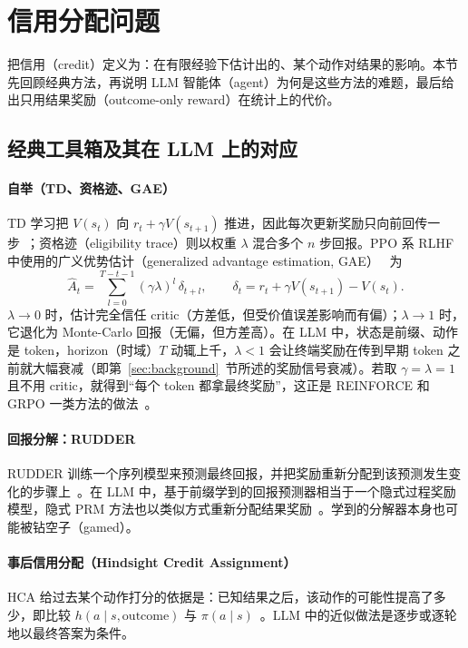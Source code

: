 \section{信用分配问题}\label{sec:problem}

\citet{pignatelli2024survey} 把信用（credit）定义为：在有限经验下估计出的、某个动作对结果的影响。本节先回顾经典方法，再说明 LLM 智能体（agent）为何是这些方法的难题，最后给出只用结果奖励（outcome-only reward）在统计上的代价。

\subsection{经典工具箱及其在 LLM 上的对应}

\paragraph{自举（TD、资格迹、GAE）}
TD 学习把 $V(s_t)$ 向 $r_t+\gamma V(s_{t+1})$ 推进，因此每次更新奖励只向前回传一步~\citep{sutton1988learning,sutton2018reinforcement}；资格迹（eligibility trace）则以权重 $\lambda$ 混合多个 $n$ 步回报。PPO 系 RLHF 中使用的广义优势估计（generalized advantage estimation, GAE）~\citep{schulman2015high} 为
\begin{equation}
  \hat A_t=\sum_{l=0}^{T-t-1}(\gamma\lambda)^l\,\delta_{t+l},\qquad
  \delta_t=r_t+\gamma V(s_{t+1})-V(s_t).
  \label{eq:gae}
\end{equation}
$\lambda\to 0$ 时，估计完全信任 critic（方差低，但受价值误差影响而有偏）；$\lambda\to1$ 时，它退化为 Monte-Carlo 回报（无偏，但方差高）。在 LLM 中，状态是前缀、动作是 token，horizon（时域）$T$ 动辄上千，$\lambda<1$ 会让终端奖励在传到早期 token 之前就大幅衰减（即第~\ref{sec:background}~节所述的奖励信号衰减）。若取 $\gamma=\lambda=1$ 且不用 critic，就得到“每个 token 都拿最终奖励”，这正是 REINFORCE 和 GRPO 一类方法的做法~\citep{hu2025reinforce,shao2024deepseekmath}。

\paragraph{回报分解：RUDDER}
RUDDER 训练一个序列模型来预测最终回报，并把奖励重新分配到该预测发生变化的步骤上~\citep{arjonamedina2019rudder}。在 LLM 中，基于前缀学到的回报预测器相当于一个隐式过程奖励模型，隐式 PRM 方法也以类似方式重新分配结果奖励~\citep{cui2025process}\unverified。学到的分解器本身也可能被钻空子（gamed）。

\paragraph{事后信用分配（Hindsight Credit Assignment）}
HCA 给过去某个动作打分的依据是：已知结果之后，该动作的可能性提高了多少，即比较 $h(a\mid s,\text{outcome})$ 与 $\pi(a\mid s)$~\citep{harutyunyan2019hindsight}。LLM 中的近似做法是逐步或逐轮地以最终答案为条件。

